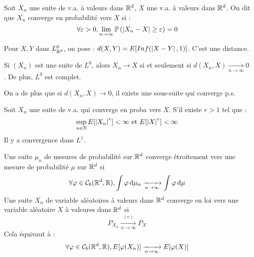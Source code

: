 \documentclass{cours}
\begin{document}
        \begin{definition}
            Soit $X_n$ une suite de v.a. à valeurs dans $\mathbb{R}^{d}$, $X$ une v.a. à valeurs dans $\mathbb{R}^{d}$. On dit que $X_{n}$ converge en probabilité vers $X$ si : 
            \[
                \forall \varepsilon > 0, \lim_{n \to \infty} \mathbb{P}\left(\left|X_{n} - X\right| \geq \varepsilon\right) = 0
            \]
        \end{definition}

        \begin{definition}
            Pour $X, Y$ dans $L_{\mathbb{R}^{d}}^{0}$, on pose : $d(X, Y) = E[Inf(\left|X - Y\right|, 1)]$. C'est une distance.
        \end{definition}

        \begin{proposition}
            Si $\left(X_{n}\right)$ est une suite de $L^{0}$, alors $X_{n} \rightarrow X$ si et seulement si $d(X_{n}, X) \xrightarrow[n \to \infty]{} 0$. De plus, $L^{0}$ est complet.             
        \end{proposition}

        
        \begin{corollary}
            On a de plus que si $d(X_{n}, X) \rightarrow 0$, il existe une sous-suite qui converge p.s. 
        \end{corollary}

        \begin{corollary}
            Soit $X_{n}$ une suite de v.a. qui converge en proba vers $X$. S'il existe $r > 1$ tel que : 
            \[
                \sup_{n \in \mathbb{N}} E[\left|X_{n}\right|^{r}] < \infty \text{ et } E[\left|X\right|^{r}] < \infty
            \]
            Il y a convergence dans $L^{1}$. 
        \end{corollary}

        \begin{definition}
            Une suite $\mu_{n}$ de mesures de probabilité sur $\mathbb{R}^{d}$ converge étroitement vers une mesure de probabilité $\mu$ sur $\mathbb{R}^{d}$ si 
            \[
                \forall \varphi \in \mathcal{C}_{b}(\mathbb{R}^{d}, \mathbb{R}), \int \varphi {\rm \, d}\mu_{n} \xrightarrow[n \to \infty]{} \int \varphi {\rm \, d}\mu
            \]
            Une suite $X_{n}$ de variable aléatoires à valeurs dans $\mathbb{R}^{d}$ converge en loi vers une variable aléatoire $X$ à valeures dans $\mathbb{R}^{d}$ si 
            \[
                P_{X_{n}} \xrightarrow[n \to \infty]{(e)} P_{X}
            \]
            Cela équivaut à : 
            \[
                \forall \varphi \in \mathcal{C}_{b}(\mathbb{R}^{d}, \mathbb{R}), E[\varphi(X_{n})] \xrightarrow[n \to \infty]{} E[\varphi(X)]
            \]
        \end{definition}
\end{document}
